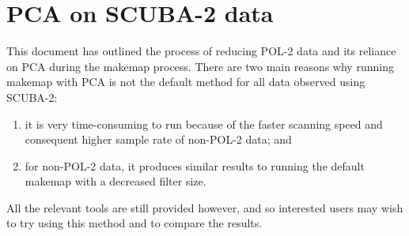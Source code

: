 \chapter{PCA on SCUBA-2 data}
\label{app:pca}

This document has outlined the process of reducing POL-2 data and its
reliance on PCA during the makemap process. There are two main reasons
why running makemap with PCA is not the default method for all data observed
using SCUBA-2:

\begin{enumerate}
\item it is very time-consuming to run because of the faster scanning speed
and consequent higher sample rate of non-POL-2 data; and
\item for non-POL-2 data, it produces similar results to running the default
makemap with a decreased filter size.
\end{enumerate}

All the relevant tools are still provided however, and so interested users
may wish to try using this method and to compare the results.

